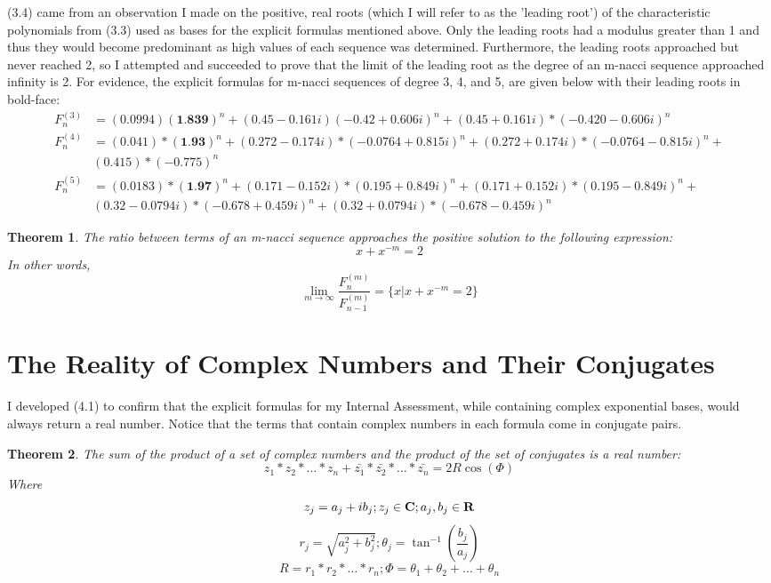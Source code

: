 \documentclass[11pt]{article}
\newtheorem{theorem}{Theorem}[section]
\begin{document}
(3.4) came from an observation I made on the positive, real roots (which I will refer to as the 'leading root') of the characteristic polynomials from (3.3) used as bases for the explicit formulas mentioned above. Only the leading roots had a modulus greater than 1 and thus they would become predominant as high values of each sequence was determined. Furthermore, the leading roots approached but never reached 2, so I attempted and succeeded to prove that the limit of the leading root as the degree of an m-nacci sequence approached infinity is 2.
For evidence, the explicit formulas for m-nacci sequences of degree 3, 4, and 5, are given below with their leading roots in bold-face:
\begin{align*}
    F^{(3)}_n &= (0.0994)(\textbf{1.839})^n + (0.45 - 0.161i)(-0.42 + 0.606i)^n + (0.45 + 0.161i)*(-0.420 - 0.606i)^n \\
    F^{(4)}_n &= (0.041)*(\textbf{1.93})^n + (0.272 - 0.174i)*(-0.0764 + 0.815i)^n + (0.272 + 0.174i)*(-0.0764 - 0.815i)^n + \\ & (0.415)*(-0.775)^n \\
    F^{(5)}_n &= (0.0183)*(\textbf{1.97})^n + (0.171 - 0.152i)*(0.195 + 0.849i)^n + (0.171 + 0.152i)*(0.195 - 0.849i)^n + \\ & (0.32 - 0.0794i)*(-0.678 + 0.459i)^n + (0.32 + 0.0794i)*(-0.678 - 0.459i)^n
\end{align*}

\begin{theorem}
    The ratio between terms of an m-nacci sequence approaches the positive solution to the following expression:
    $$x+x^{-m}=2$$
    In other words, 
    $$\lim_{m \to \infty} \frac{F^{(m)}_n}{F^{(m)}_{n-1}}=\{x|x+x^{-m}=2\}$$
\end{theorem}

\section{The Reality of Complex Numbers and Their Conjugates}

I developed (4.1) to confirm that the explicit formulas for my Internal Assessment, while containing complex exponential bases, would always return a real number. Notice that the terms that contain complex numbers in each formula come in conjugate pairs.

\begin{theorem}
    The sum of the product of a set of complex numbers and the product of the set of conjugates is a real number:
    $$z_1*z_2*\dots*z_n+\bar{z_1}*\bar{z_2}*\dots*\bar{z_n}=2R\cos{(\Phi)}$$
    Where
    $$z_j=a_j+ib_j;z_j\in\mbox{\textbf{C}};a_j,b_j\in\mbox{\textbf{R}}$$
    $$r_j=\sqrt{a_j^2+b_j^2};\theta_j=\tan^{-1}{\left(\frac{b_j}{a_j}\right)}$$
    $$R=r_1*r_2*\dots*r_n;\Phi=\theta_1+\theta_2+\dots+\theta_n$$
\end{theorem}
\end{document}
